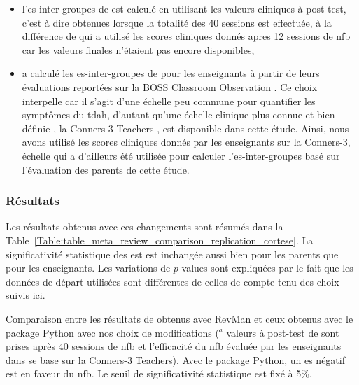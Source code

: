 \begin{itemize}
\item l'\gls{es}-inter-groupes de \citet{Arnold2014} est calculé en utilisant les valeurs cliniques à post-test, c'est à dire obtenues lorsque la totalité 
des 40 sessions est effectuée, à la différence de \citet{Cortese2016} qui a utilisé les scores cliniques donnés apres 12 sessions de \gls{nfb} car les valeurs 
finales n'étaient pas encore disponibles,
\item \citet{Cortese2016} a calculé les \gls{es}-inter-groupes de \citet{Steiner2014} pour les enseignants à partir de leurs évaluations reportées sur 
la BOSS Classroom Observation \citep{Shapiro2010}. Ce choix interpelle car il s'agit d'une échelle peu commune pour quantifier les symptômes du \gls{tdah}, d'autant qu'une échelle clinique 
plus connue et bien définie \citep{Collett2003, Epstein2012, Bluschke2016}, la Conners-3 Teachers \citep{Conners1998, Conners2008}, est disponible dans 
cette étude. Ainsi, nous avons utilisé les scores cliniques donnés par les enseignants sur la Conners-3, échelle 
qui a d'ailleurs été utilisée pour calculer l'\gls{es}-inter-groupes basé sur l'évaluation des parents de cette étude. 
\end{itemize}

\subsubsection{Résultats}

Les résultats obtenus avec ces changements sont résumés dans la Table~\ref{Table:table_meta_review_comparison_replication_cortese}.
La significativité statistique des \gls{est} est inchangée aussi bien pour les parents que pour les enseignants. Les variations de $p$-values sont expliquées
par le fait que les données de départ utilisées sont différentes de celles de \citet{Cortese2016} compte tenu des choix suivis ici.

\begin{table}[h!]
  \centering
  \caption{Comparaison entre les résultats de \citet{Cortese2016} obtenus avec RevMan \citep{Revman} et ceux obtenus avec le package Python \citep{Bussalb2019clinical}
	avec nos choix de modifications ($^a$ valeurs à post-test de \citet{Arnold2014} sont prises après 40 sessions de \gls{nfb} et l'efficacité du \gls{nfb} évaluée 
	par les enseignants dans \citet{Steiner2014} se base sur la Conners-3 Teachers).
	Avec le package Python, un \gls{es} négatif est en faveur du \gls{nfb}. Le seuil de significativité statistique est fixé à 5\%.}
  
  \label{Table:table_meta_review_comparison_replication_cortese}
\end{table}

